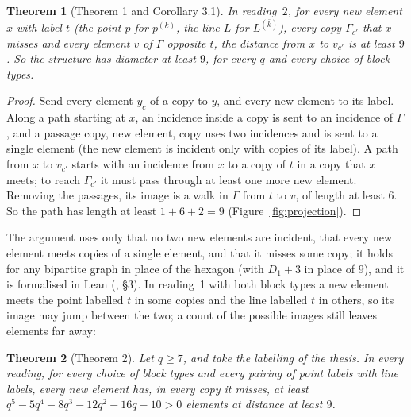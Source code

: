 \documentclass[11pt]{amsart}
\newtheorem{theorem}{Theorem}[section]
\theoremstyle{definition}
\theoremstyle{remark}
\begin{document}
\begin{theorem}[Theorem 1 and Corollary 3.1]\label{thm:projection}
In reading~$2$, for every new element $x$ with label $t$ \textup{(}the point $p$ for $p^{(k)}$, the line $L$ for $L^{(\bar k)}$\textup{)}, every copy $\Gamma_{c'}$ that $x$ misses and every element $v$ of $\Gamma$ opposite $t$, the distance from $x$ to $v_{c'}$ is at least $9$. So the structure has diameter at least $9$, for every $q$ and every choice of block types.
\end{theorem}

\begin{proof}
Send every element $y_c$ of a copy to $y$, and every new element to its label. Along a path starting at $x$, an incidence inside a copy is sent to an incidence of $\Gamma$, and a passage copy, new element, copy uses two incidences and is sent to a single element (the new element is incident only with copies of its label). A path from $x$ to $v_{c'}$ starts with an incidence from $x$ to a copy of $t$ in a copy that $x$ meets; to reach $\Gamma_{c'}$ it must pass through at least one more new element. Removing the passages, its image is a walk in $\Gamma$ from $t$ to $v$, of length at least $6$. So the path has length at least $1+6+2=9$ (Figure~\ref{fig:projection}).
\end{proof}

The argument uses only that no two new elements are incident, that every new element meets copies of a single element, and that it misses some copy; it holds for any bipartite graph in place of the hexagon (with $D_1+3$ in place of $9$), and it is formalised in Lean (, \S3). In reading~1 with both block types a new element meets the point labelled $t$ in some copies and the line labelled $t$ in others, so its image may jump between the two; a count of the possible images still leaves elements far away:

\begin{theorem}[Theorem 2]\label{thm:twolabels}
Let $q\ge7$, and take the labelling of the thesis. In every reading, for every choice of block types and every pairing of point labels with line labels, every new element has, in every copy it misses, at least $q^5-5q^4-8q^3-12q^2-16q-10>0$ elements at distance at least $9$.
\end{theorem}
\end{document}

